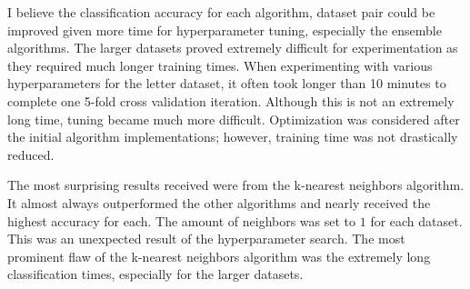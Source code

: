 \documentclass[11pt,titlepage]{article}
\begin{document}
I believe the classification accuracy for each algorithm, dataset pair could be improved given more time for hyperparameter tuning, especially the ensemble algorithms. The larger datasets proved extremely difficult for experimentation as they required much longer training times. When experimenting with various hyperparameters for the letter dataset, it often took longer than 10 minutes to complete one 5-fold cross validation iteration. Although this is not an extremely long time, tuning became much more difficult. Optimization was considered after the initial algorithm implementations; however, training time was not drastically reduced.

The most surprising results received were from the k-nearest neighbors algorithm. It almost always outperformed the other algorithms and nearly received the highest accuracy for each. The amount of neighbors was set to $1$ for each dataset. This was an unexpected result of the hyperparameter search. The most prominent flaw of the k-nearest neighbors algorithm was the extremely long classification times, especially for the larger datasets.

\clearpage


\end{document}

